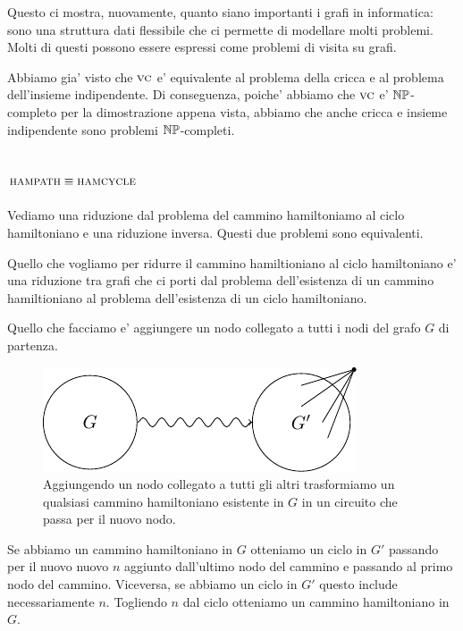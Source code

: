 Questo ci mostra, nuovamente, quanto siano importanti i grafi in informatica: sono una struttura
dati flessibile che ci permette di modellare molti problemi. Molti di questi possono essere espressi
come problemi di visita su grafi.

Abbiamo gia' visto che $\textsc{vc}$ e' equivalente al problema della cricca e al problema dell'insieme
indipendente. Di conseguenza, poiche' abbiamo che $\textsc{vc}$ e' $\mathbb{NP}$-completo per la dimostrazione
appena vista, abbiamo che anche cricca e insieme indipendente sono problemi $\mathbb{NP}$-completi.

\subsection{$\textsc{hampath} \equiv \textsc{hamcycle}$}

Vediamo una riduzione dal problema del cammino hamiltoniamo al ciclo hamiltoniano e una riduzione
inversa. Questi due problemi sono equivalenti.

Quello che vogliamo per ridurre il cammino hamiltioniano al ciclo hamiltoniano e' una riduzione tra
grafi che ci porti dal problema dell'esistenza di un cammino hamiltioniano al problema
dell'esistenza di un ciclo hamiltoniano.

Quello che facciamo e' aggiungere un nodo collegato a tutti i nodi del grafo $G$ di partenza.

\begin{figure}[h]
    \begin{center}
        \includegraphics{./img/NPClass/HAMPATHCYCLE.pdf}
        \caption{Aggiungendo un nodo collegato a tutti gli altri trasformiamo un qualsiasi cammino
        hamiltoniano esistente in $G$ in un circuito che passa per il nuovo nodo.}
    \end{center}
\end{figure}

Se abbiamo un cammino hamiltoniano in $G$ otteniamo un ciclo in $G'$ passando per il nuovo nuovo $n$
aggiunto dall'ultimo nodo del cammino e passando al primo nodo del cammino. Viceversa, se abbiamo un
ciclo in $G'$ questo include necessariamente $n$. Togliendo $n$ dal ciclo otteniamo un cammino
hamiltoniano in $G$.

